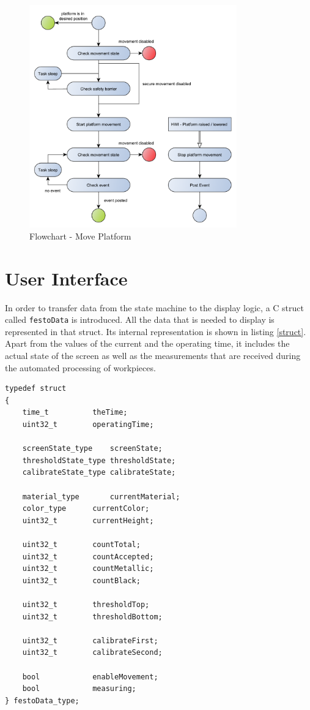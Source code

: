 \begin{figure}[H]
	\begin{center}
		\includegraphics[width=0.8\textwidth]{media/Flow_Chart_MovePlatform.pdf} 	
		\caption{Flowchart - Move Platform}
		\label{fig:moveplatform}
	\end{center}
\end{figure}



\section{User Interface} \label{sec:userinterface} %

In order to transfer data from the state machine to the display logic, a C struct called \texttt{festoData} is introduced. All the data that is needed to display is represented in that struct. Its internal representation is shown in listing \ref{struct}. Apart from the values of the current and the operating time, it includes the actual state of the screen as well as the measurements that are received during the automated processing of workpieces.

\begin{lstlisting}[label=struct, caption=festoData struct, style=customc]
typedef struct
{
	time_t 			theTime;
	uint32_t 		operatingTime;
	
	screenState_type 	screenState;
	thresholdState_type	thresholdState;
	calibrateState_type	calibrateState;
	
	material_type 		currentMaterial;
	color_type 		currentColor;
	uint32_t 		currentHeight;
	
	uint32_t		countTotal;
	uint32_t 		countAccepted;
	uint32_t 		countMetallic;
	uint32_t 		countBlack;
	
	uint32_t 		thresholdTop;
	uint32_t 		thresholdBottom;
	
	uint32_t 		calibrateFirst;
	uint32_t 		calibrateSecond;
	
	bool 			enableMovement;
	bool 			measuring;
} festoData_type;
\end{lstlisting}

